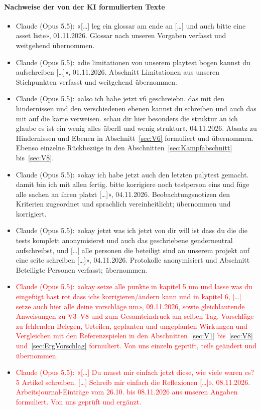 \documentclass[../Main.tex]{subfiles}
\begin{document}
\paragraph{Nachweise der von der KI formulierten Texte}
\begin{itemize}[leftmargin=1.5cm, itemsep=0.4em]
    \item Claude (Opus 5.5): «[\ldots] leg ein glossar am ende an [\ldots] und auch bitte eine asset liste», 01.11.2026. Glossar nach unseren Vorgaben verfasst und weitgehend übernommen.
    \item Claude (Opus 5.5): «die limitationen von unserem playtest bogen kannst du aufschreiben [\ldots]», 01.11.2026. Abschnitt Limitationen aus unseren Stichpunkten verfasst und weitgehend übernommen.
    \item Claude (Opus 5.5): «also ich habe jetzt v6 geschreiebn. das mit den hindernissen und den verschiedenen ebenen kannst du schreiben und auch das mit auf die karte verweisen. schau dir hier besonders die struktur an ich glaube es ist ein wenig alles überll und wenig struktur», 04.11.2026. Absatz zu Hindernissen und Ebenen in Abschnitt~\ref{sec:V6} formuliert und übernommen. Ebenso einzelne Rückbezüge in den Abschnitten~\ref{sec:Kampfabschnitt} bis~\ref{sec:V8}.
    \item Claude (Opus 5.5): «okay ich habe jetzt auch den letzten palytest gemacht. damit bin ich mit allen fertig. bitte korrigiere noch testperson eins und füge alle sachen an ihren platzt [\ldots]», 04.11.2026. Beobachtungsnotizen den Kriterien zugeordnet und sprachlich vereinheitlicht; übernommen und korrigiert.
    \item Claude (Opus 5.5): «okay jetzt was ich jetzt von dir will ist dass du die die tests komplett anonymisierst und auch das geschriebene genderneutral aufschreibst, und [\ldots] alle personen die beteiligt sind an unserem projekt auf eine seite schreiben [\ldots]», 04.11.2026. Protokolle anonymisiert und Abschnitt Beteiligte Personen verfasst; übernommen.
    \item \textcolor{red}{Claude (Opus 5.5): «okay setze alle punkte in kapitel 5 um und lasse was du eingefügt hast rot dass ichs korrigieren/ändern kann und in kapitel 6, [\ldots] setze auch hier alle deine vorschläge um», 09.11.2026, sowie gleichlautende Anweisungen zu V3--V8 und zum Gesamteindruck am selben Tag. Vorschläge zu fehlenden Belegen, Urteilen, geplanten und ungeplanten Wirkungen und Vergleichen mit den Referenzspielen in den Abschnitten~\ref{sec:V1} bis~\ref{sec:V8} und~\ref{sec:ErgVorschlag} formuliert. Von uns einzeln geprüft, teils geändert und übernommen.}
    \item \textcolor{red}{Claude (Opus 5.5): «[\ldots] Du musst mir einfach jetzt diese, wie viele waren es? 5 Artikel schreiben. [\ldots] Schreib mir einfach die Reflexionen [\ldots]», 08.11.2026. Arbeitsjournal-Einträge vom 26.10. bis 08.11.2026 aus unseren Angaben formuliert. Von uns geprüft und ergänzt.}
\end{itemize}
\end{document}
